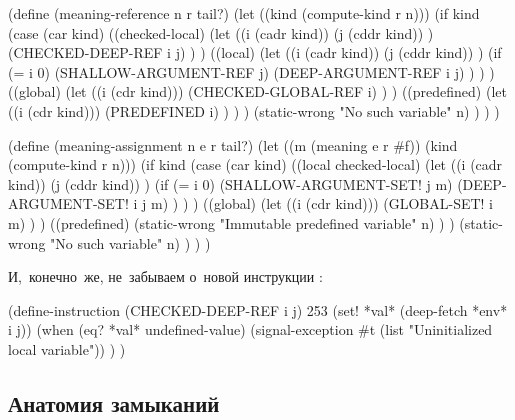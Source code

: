 \begin{code:lisp}
(define (meaning-reference n r tail?)
  (let ((kind (compute-kind r n)))
    (if kind (case (car kind)
               ((checked-local)
                (let ((i (cadr kind))
                      (j (cddr kind)) )
                  (CHECKED-DEEP-REF i j) ) )
               ((local)
                (let ((i (cadr kind))
                      (j (cddr kind)) )
                  (if (= i 0)
                      (SHALLOW-ARGUMENT-REF j)
                      (DEEP-ARGUMENT-REF i j) ) ) )
               ((global)
                (let ((i (cdr kind)))
                  (CHECKED-GLOBAL-REF i) ) )
               ((predefined)
                (let ((i (cdr kind)))
                  (PREDEFINED i) ) ) )
        (static-wrong "No such variable" n) ) ) )

(define (meaning-assignment n e r tail?)
  (let ((m (meaning e r #f))
        (kind (compute-kind r n)))
    (if kind
        (case (car kind)
          ((local checked-local)
           (let ((i (cadr kind))
                 (j (cddr kind)) )
             (if (= i 0)
                 (SHALLOW-ARGUMENT-SET! j m)
                 (DEEP-ARGUMENT-SET! i j m) ) ) )
          ((global)
           (let ((i (cdr kind)))
             (GLOBAL-SET! i m) ) )
          ((predefined)
           (static-wrong "Immutable predefined variable" n) ) )
        (static-wrong "No such variable" n) ) ) )
\end{code:lisp}

И,~конечно~же, не~забываем о~новой инструкции :

\begin{code:lisp}
(define-instruction (CHECKED-DEEP-REF i j) 253
  (set! *val* (deep-fetch *env* i j))
  (when (eq? *val* undefined-value)
    (signal-exception #t (list "Uninitialized local variable")) ) )
\end{code:lisp}


\subsection{Анатомия замыканий}\label{reflection/reify-env/ssect:closed}

